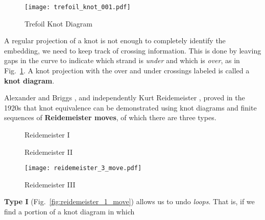         \begin{figure}
            \centering
            \texttt{[image: trefoil\_knot\_001.pdf]}
            \caption{Trefoil Knot Diagram}
            \label{fig:trefoil_knot_001}
        \end{figure}
        A regular projection of a knot is not enough to completely identify the
        embedding, we need to keep track of crossing information. This is done
        by leaving gaps in the curve to indicate which strand is \textit{under}
        and which is \textit{over}, as in Fig.~\ref{fig:trefoil_knot_001}. A
        knot projection with the over and under crossings labeled is called a
        \textbf{knot diagram}.
        \par\hfill\par
        Alexander and Briggs \cite{AlexanderBriggs1926}, and independently
        Kurt Reidemeister \cite{Reidemeister1927}, proved in the 1920s that
        knot equivalence can be demonstrated using knot diagrams and finite
        sequences of \textbf{Reidemeister moves}, of which there are three
        types.
        \par\hfill\par
        \begin{figure}
            \centering
            \begin{minipage}[b]{0.4\textwidth}
                \centering
                \caption{Reidemeister I}
                \label{fig:reidemeister_1_move}
            \end{minipage}
            \hfill
            \begin{minipage}[b]{0.5\textwidth}
                \centering
                \caption{Reidemeister II}
                \label{fig:reidemeister_2_move}
            \end{minipage}
        \end{figure}
        \begin{figure}
            \centering
            \texttt{[image: reidemeister\_3\_move.pdf]}
            \caption{Reidemeister III}
            \label{fig:reidemeister_3_move}
        \end{figure}
        \textbf{Type I} (Fig.~\ref{fig:reidemeister_1_move}) allows us to undo
        \textit{loops}. That is, if we find a portion of a knot diagram in which

